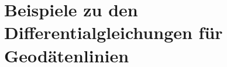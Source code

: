 \section{Beispiele zu den Differentialgleichungen für Geodätenlinien 
\label{geodaeten:section:StandardverfahrenBeispiele}}




